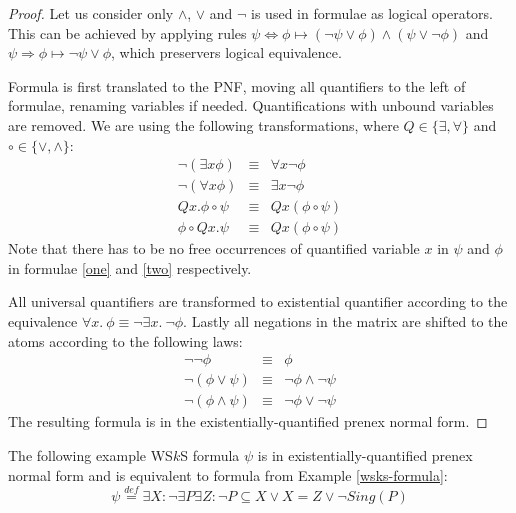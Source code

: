	\begin{proof}
Let us consider only $\wedge$, $\vee$ and $\neg$ is used in formulae as logical
operators. This can be achieved by applying rules $\psi \Leftrightarrow \phi
\mapsto (\neg \psi \vee \phi) \wedge (\psi \vee \neg \phi)$ and $\psi
\Rightarrow \phi \mapsto \neg \psi \vee \phi$, which preservers logical
equivalence.
	
Formula is first translated to the PNF, moving all quantifiers to the left
of formulae, renaming variables if needed. Quantifications with unbound
variables are removed. We are using the following transformations, where $Q \in
\{\exists, \forall\}$ and $\circ \in \{\vee, \wedge\}$:
	\begin{eqnarray}
	 \neg(\exists x \phi) & \equiv & \forall x\neg \phi\\
	 \neg(\forall x \phi) & \equiv & \exists x\neg \phi\\
	 Qx.\phi \circ \psi & \equiv & Qx(\phi \circ \psi)\label{one}\\
	 \phi \circ Qx.\psi & \equiv & Qx(\phi \circ \psi)\label{two}
	\end{eqnarray}
Note that there has to be no free occurrences of quantified variable $x$ in
$\psi$ and $\phi$ in formulae \ref{one} and \ref{two} respectively.
	
All universal quantifiers are transformed to existential quantifier
according to the equivalence $\forall x.\ \phi \equiv \neg\exists x.\ \neg\phi$.
Lastly all negations in the matrix are shifted to the atoms according to the
following laws:
	\begin{eqnarray}
	 \neg\neg\phi & \equiv & \phi\\
	 \neg(\phi\vee \psi) & \equiv & \neg \phi \wedge \neg \psi\\
	 \neg(\phi\wedge \psi) & \equiv & \neg \phi \vee \neg \psi 
	\end{eqnarray}
 The resulting formula is in the existentially-quantified prenex normal form. 
	\end{proof}
	
	  \noindent\hrulefill
  \begin{example}
  The following example WS$k$S formula $\psi$ is in existentially-quantified prenex normal
form and is equivalent to formula from Example \ref{wsks-formula}:
  \begin{equation}
   \psi \overset{\mathit{def}}{=} \exists X: \neg \exists P \exists Z: \neg P
   \subseteq X \vee X = Z \vee \neg\mathit{Sing}(P)
  \end{equation}
   \hrulefill
  \end{example}\label{wsks-formula-restricted}
	
